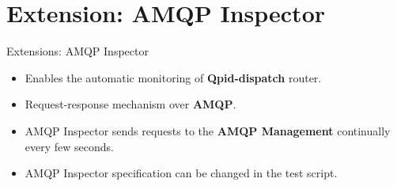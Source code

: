 \documentclass[hyperref={pdfpagelabels=false, unicode},pdf,slideColor,fyma,9pt]{beamer}
\begin{document}
    \section{Extension: AMQP Inspector}
		\begin{frame}{Extensions: AMQP Inspector}
      \begin{itemize}
        \setlength\itemsep{0.5em}
        \item Enables the automatic monitoring of \textbf{Qpid-dispatch} router.
        \item Request-response mechanism over \textbf{AMQP}.
        \item AMQP Inspector sends requests to the \textbf{AMQP Management} continually every few seconds.
        \item AMQP Inspector specification can be changed in the test script.
    \end{itemize}
      \begin{figure}[ht]
        \begin{center}
        \end{center}
      \end{figure}
    \end{frame}

\end{document}
